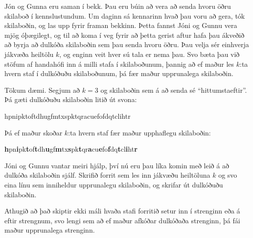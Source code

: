 

Jón og Gunna eru saman í bekk. Þau eru búin að vera að senda hvoru öðru
skilaboð í kennslustundum. Um daginn sá kennarinn hvað þau voru að gera, tók
skilaboðin, og las upp fyrir framan bekkinn. Þetta fannst Jóni og Gunnu vera
mjög óþægilegt, og til að koma í veg fyrir að þetta gerist aftur hafa þau
ákveðið að byrja að dulkóða skilaboðin sem þau senda hvoru öðru. Þau velja sér
einhverja jákvæða heiltölu $k$, og enginn veit hver sú tala er nema þau. Svo
bæta þau við stöfum af handahófi inn á milli stafa í skilaboðunum, þannig að ef
maður les $k$:ta hvern staf í dulkóðuðu skilaboðunum, þá fær maður upprunalega
skilaboðin.

Tökum dæmi. Segjum að $k=3$ og skilaboðin sem á að senda sé ``hittumstaeftir''. Þá gæti dulkóðuðu skilaboðin litið út svona:
\begin{center}
hpnipktoftdhugfmtxspktqracuefofdqtclihtr
\end{center}
Þá ef maður skoðar $k$:ta hvern staf fær maður upphaflegu skilaboðin:
\begin{center}
\textbf{h}pn\textbf{i}pk\textbf{t}of\textbf{t}dh\textbf{u}gf\textbf{m}tx\textbf{s}pk\textbf{t}qr\textbf{a}cu\textbf{e}fo\textbf{f}dq\textbf{t}cl\textbf{i}ht\textbf{r}
\end{center}

Jóni og Gunnu vantar meiri hjálp, því nú eru þau líka komin með leið á að
dulkóða skilaboðin sjálf. Skrifið forrit sem les inn jákvæðu heiltöluna $k$ og
svo eina línu sem inniheldur upprunalegu skilaboðin, og skrifar út dulkóðuðu
skilaboðin.

Athugið að það skiptir ekki máli hvaða stafi forritið setur inn í strenginn eða
á eftir strengnum, svo lengi sem að ef maður afkóðar dulkóðaða strenginn, þá fái
maður upprunalega strenginn.

